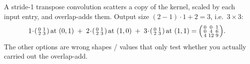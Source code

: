 \documentclass[11pt,oneside]{article}
\newenvironment{answerprose}[1]{%
  \begin{keybox}[Answer]}%
  {\end{keybox}}
\begin{document}
\begin{answerprose}{H, $\begin{psmallmatrix}0&0&1\\0&4&6\\4&12&9\end{psmallmatrix}$}
A stride-1 transpose convolution scatters a copy of the kernel, scaled by each input entry, and
overlap-adds them. Output size $(2-1)\cdot 1 + 2 = 3$, i.e.\ $3\times3$:
\[
1\!\cdot\!\begin{psmallmatrix}0&1\\2&3\end{psmallmatrix}\!\text{ at }(0,1)
\;+\;2\!\cdot\!\begin{psmallmatrix}0&1\\2&3\end{psmallmatrix}\!\text{ at }(1,0)
\;+\;3\!\cdot\!\begin{psmallmatrix}0&1\\2&3\end{psmallmatrix}\!\text{ at }(1,1)
=\begin{psmallmatrix}0&0&1\\0&4&6\\4&12&9\end{psmallmatrix}.
\]
The other options are wrong shapes / values that only test whether you actually carried out the overlap-add.
\end{answerprose}
\end{document}
